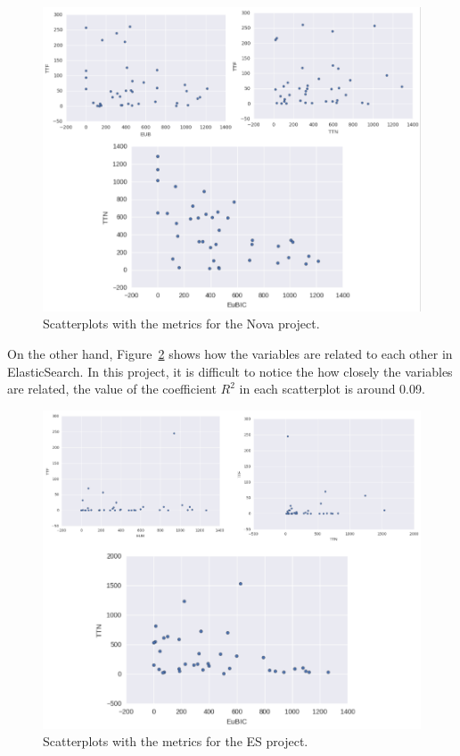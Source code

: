 \documentclass[10pt, conference]{IEEEtran}
\begin{document}
\begin{figure}[ht]
\centering
\includegraphics[width=\columnwidth]{DistributionNova_b.png}
\caption{ Scatterplots with the metrics for the Nova project.}
\label{fig:graph}       %
\end{figure}

On the other hand, Figure~\ref{fig:graph1} shows how the variables are related to each other in ElasticSearch. In this project, it is difficult to notice the how closely the variables are related, the value of the coefficient $R^2$ in each scatterplot is around 0.09. 

\begin{figure}[ht]
\centering
\includegraphics[width=\columnwidth]{DistributionES_b.png}
\caption{Scatterplots with the metrics for the ES project.}
\label{fig:graph1}       %
\end{figure}
\end{document}
